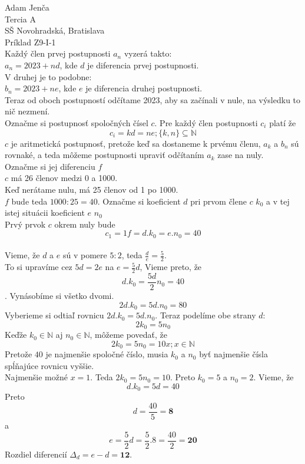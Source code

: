\documentclass{article}
\newcommand \nat{%
	\mathbb{N}
}
\newcommand \innat{%
	\in\nat
}
\begin{document}
\noindent
\large
Adam Jenča\\
Tercia A\\
SŠ Novohradská, Bratislava\\
Príklad Z9-I-1\\
\vskip 10mm \noindent
Každý člen prvej postupnosti $a_n$ vyzerá takto:\\

{ $a_n = 2023 + nd$, kde $d$ je diferencia prvej postupnosti.}\\
\noindent
V druhej je to podobne:\\

{$b_n = 2023 + ne$, kde $e$ je diferencia druhej postupnosti.}\\\noindent
Teraz od oboch postupností odčítame 2023, aby sa začínali v nule, na výsledku to nič nezmení.\\


\noindent
Označme si postupnosť spoločných čísel $c$.
Pre každý člen postupnosti $c_i$ platí že
$$
	c_i = kd = ne ; \{k,n\}\subseteq \nat
$$
$c$ je aritmetická postupnosť, pretože keď sa dostaneme k prvému členu, $a_k$ a $b_n$  sú rovnaké, a teda môžeme postupnosti upraviť odčítaním $a_k$ zase na nuly.\\
Označme si jej diferenciu $f$\\
$c$ má 26 členov medzi 0 a 1000.\\
Keď nerátame nulu, má 25 členov od 1 po 1000.\\
$f$ bude teda $1000:25=40$.
Označme si koeficient $d$ pri prvom člene $c$ $k_0$ a v tej istej situácii koeficient $e$ $n_0$\\
Prvý prvok $c$ okrem nuly bude $$c_1=1f=d. k_0=e. n_0=40$$\\
Vieme, že $d$ a $e$ sú v pomere $5:2$, teda $\frac{d}{e} = \frac{5}{2}$.\\
To si upravíme cez $5d = 2e$ na $e=\frac{5}{2}d$,
Vieme preto, že $$d. k_0 = \frac{5d}{2}n_0 = 40$$.
Vynásobíme si všetko dvomi.
$$2d. k_0 = 5d. n_0 = 80$$
Vyberieme si odtiaľ rovnicu $2d. k_0 = 5d. n_0$.
Teraz podelíme obe strany $d$:
$$2k_0 = 5n_0$$
Keďže $k_0 \innat$ aj $n_0\innat$, môžeme povedať, že $$2k_0 = 5n_0 = 10x; x\innat$$
Pretože $40$ je najmenšie spoločné číslo, musia $k_0$ a $n_0$ byť najmenšie čísla spĺňajúce rovnicu vyššie.\\
Najmenšie možné $x = 1$. Teda $2k_0 = 5n_0 = 10$.
Preto $k_0 = 5$ a $n_0 = 2$.
Vieme, že
$$d. k_0 = 5d = 40$$
\noindent Preto
$$d = \frac{40}{5} =\mathbf{8}$$
\noindent
a $$e = \frac{5}{2}d=\frac{5}{2}. 8 = \frac{40}{2}=\mathbf{20}$$
\noindent
Rozdiel diferencií $\Delta_d=e-d=\mathbf{12}$.
\end{document}
